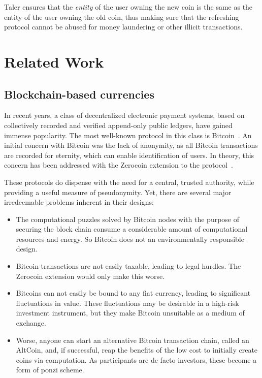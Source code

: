 \documentclass{llncs}
\begin{document}
Taler ensures that the {\em entity} of the user owning the new coin is
the same as the entity of the user owning the old coin, thus making
sure that the refreshing protocol cannot be abused for money
laundering or other illicit transactions.


\section{Related Work}

\subsection{Blockchain-based currencies}

In recent years, a class of decentralized electronic payment systems,
based on collectively recorded and verified append-only public
ledgers, have gained immense popularity.  The most well-known protocol
in this class is Bitcoin~\cite{nakamoto2008bitcoin}.  An initial
concern with Bitcoin was the lack of anonymity, as all Bitcoin
transactions are recorded for eternity, which can enable
identification of users.  In theory, this concern has been addressed
with the Zerocoin extension to the protocol~\cite{miers2013zerocoin}.

These protocols do dispense with the need for a central, trusted
authority, while providing a useful measure of pseudonymity.
Yet, there are several major irredeemable problems inherent in their designs:

\begin{itemize}
  \item The computational puzzles solved by Bitcoin nodes with the purpose
    of securing the block chain consume a considerable amount of computational
    resources and energy.  So Bitcoin does not an environmentally responsible
    design.
  \item Bitcoin transactions are not easily taxable, leading to legal hurdles. 
    The Zerocoin extension would only make this worse.
  \item Bitcoins can not easily be bound to any fiat currency, leading to
    significant fluctuations in value.  These fluctuations may be desirable in
    a high-risk investment instrument, but they make Bitcoin unsuitable as
    a medium of exchange.
  \item Worse, anyone can start an alternative Bitcoin transaction chain,
    called an AltCoin, and, if successful, reap the benefits of the low
    cost to initially create coins via computation.  As participants are
    de facto investors, these become a form of ponzi scheme.
\end{itemize}
\end{document}

